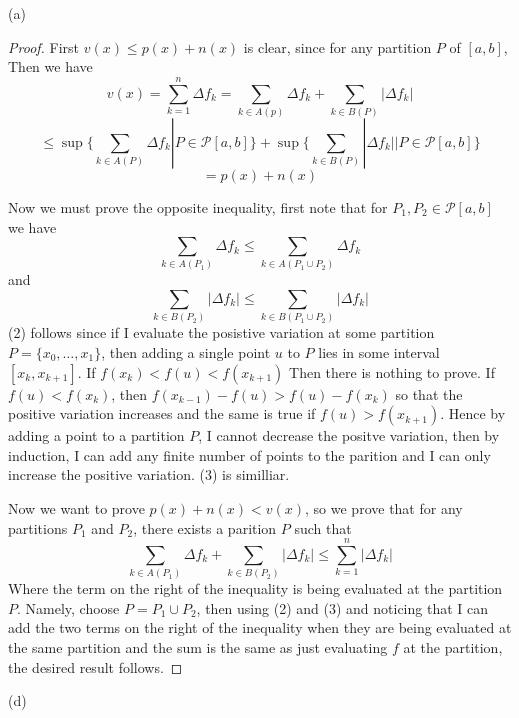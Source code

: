 \documentclass[11pt,largemargins]{homework}
\begin{document}
\begin{alphaparts} 
\questionpart 
(a) 

\begin{proof} 
	First $v(x) \leq p(x) + n(x)$ is clear, since for any partition $P$ of $[a,b]$, Then we have 
	\[ v(x) = \sum_{k=1}^n \Delta f_k = \sum_{k \in A(p)} \Delta f_k + \sum_{k \in B(P)}| \Delta f_k |\] 
	\[ \leq \sup \{\sum_{k \in A(P)} \Delta f_k | P \in \mathcal{P}[a, b] \} +\sup \{\sum_{k \in B(P)}| \Delta f_k| | P \in \mathcal{P}[a, b] \} \]
	\[= p(x) + n(x) \]

	Now we must prove the opposite inequality, first note that for $P_1, P_2 \in \mathcal{P}[a, b]$ we have 
	\begin{equation} \sum_{k \in A(P_1)} \Delta f_k \leq \sum_{k \in A(P_1 \cup P_2)} \Delta f_k \end{equation} 
	and 
	\begin{equation} \sum_{k \in B(P_2)} |\Delta f_k| \leq \sum_{k \in B(P_1 \cup P_2)} |\Delta f_k| \end{equation} 
	(2) follows since if I evaluate the posistive variation at some partition $P = \{x_0, \dots, x_1 \}$, then adding a single point $u$ to $P$
	lies in some interval $[x_k, x_{k+1}]$. If $f(x_k) < f(u) < f(x_{k+1})$ Then there is nothing to prove. If $f(u) < f(x_k)$, 
	then $f(x_{k-1}) - f(u) > f(u) - f(x_k)$ so that the positive variation increases and the same is true if $f(u) > f(x_{k+1})$. 
	Hence by adding a point to a partition $P$, I cannot decrease the positve variation, then by induction, I can add any finite number of points to the 
	parition and I can only increase the positive variation. (3) is similliar. 
	
	Now we want to prove $p(x) + n(x) < v(x)$, so we prove that for any partitions $P_1$ and $P_2$, there exists a parition $P$ such that 
	\begin{equation} \sum_{k \in A(P_1)} \Delta f_k + \sum_{k \in B(P_2)} |\Delta f_k | \leq \sum_{k = 1}^n |\Delta f_k | \end{equation}  
        Where the term on the right of the inequality is being evaluated at the partition $P$.	Namely, choose $P= P_1 \cup P_2$, then using (2) and (3) and
	noticing that I can add the two terms on the right of the inequality when they are being evaluated at the same partition and the sum 
	is the same as just evaluating $f$ at the partition, the desired result follows. 
\end{proof} 

\questionpart 
(d) 


\end{alphaparts}
\end{document}
